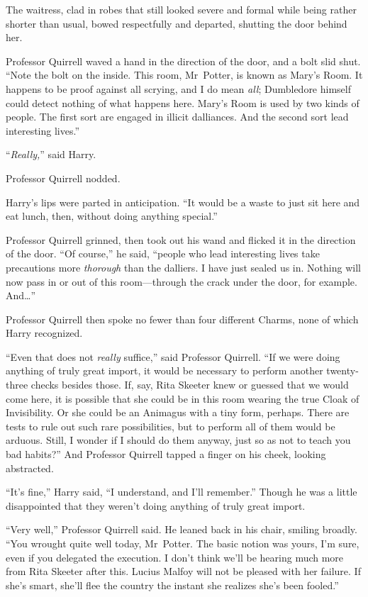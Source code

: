 The waitress, clad in robes that still looked severe and formal while being rather shorter than usual, bowed respectfully and departed, shutting the door behind her.

Professor Quirrell waved a hand in the direction of the door, and a bolt slid shut. “Note the bolt on the inside. This room, Mr~Potter, is known as Mary’s Room. It happens to be proof against all scrying, and I do mean \emph{all}; Dumbledore himself could detect nothing of what happens here. Mary’s Room is used by two kinds of people. The first sort are engaged in illicit dalliances. And the second sort lead interesting lives.”

“\emph{Really,}” said Harry.

Professor Quirrell nodded.

Harry’s lips were parted in anticipation. “It would be a waste to just sit here and eat lunch, then, without doing anything special.”

Professor Quirrell grinned, then took out his wand and flicked it in the direction of the door. “Of course,” he said, “people who lead interesting lives take precautions more \emph{thorough} than the dalliers. I have just sealed us in. Nothing will now pass in or out of this room—through the crack under the door, for example. And…”

Professor Quirrell then spoke no fewer than four different Charms, none of which Harry recognized.

“Even that does not \emph{really} suffice,” said Professor Quirrell. “If we were doing anything of truly great import, it would be necessary to perform another twenty-three checks besides those. If, say, Rita Skeeter knew or guessed that we would come here, it is possible that she could be in this room wearing the true Cloak of Invisibility. Or she could be an Animagus with a tiny form, perhaps. There are tests to rule out such rare possibilities, but to perform all of them would be arduous. Still, I wonder if I should do them anyway, just so as not to teach you bad habits?” And Professor Quirrell tapped a finger on his cheek, looking abstracted.

“It’s fine,” Harry said, “I understand, and I’ll remember.” Though he was a little disappointed that they weren’t doing anything of truly great import.

“Very well,” Professor Quirrell said. He leaned back in his chair, smiling broadly. “You wrought quite well today, Mr~Potter. The basic notion was yours, I’m sure, even if you delegated the execution. I don’t think we’ll be hearing much more from Rita Skeeter after this. Lucius Malfoy will not be pleased with her failure. If she’s smart, she’ll flee the country the instant she realizes she’s been fooled.”

